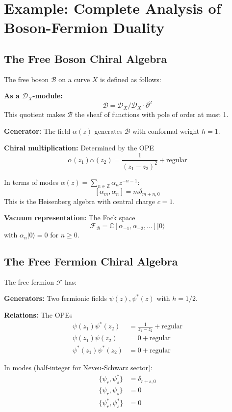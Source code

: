 \section{Example: Complete Analysis of Boson-Fermion Duality}

\subsection{The Free Boson Chiral Algebra}

The free boson $\mathcal{B}$ on a curve $X$ is defined as follows:

\textbf{As a $\mathcal{D}_X$-module:}
\[
\mathcal{B} = \mathcal{D}_X / \mathcal{D}_X \cdot \partial^2
\]
This quotient makes $\mathcal{B}$ the sheaf of functions with pole of order at most 1.

\textbf{Generator:} The field $\alpha(z)$ generates $\mathcal{B}$ with conformal weight $h = 1$.

\textbf{Chiral multiplication:} Determined by the OPE
\[
\alpha(z_1) \alpha(z_2) = \frac{1}{(z_1-z_2)^2} + \text{regular}
\]

In terms of modes $\alpha(z) = \sum_{n \in \mathbb{Z}} \alpha_n z^{-n-1}$:
\[
[\alpha_m, \alpha_n] = m \delta_{m+n,0}
\]
This is the Heisenberg algebra with central charge $c = 1$.

\textbf{Vacuum representation:} The Fock space
\[
\mathcal{F}_{\mathcal{B}} = \mathbb{C}[\alpha_{-1}, \alpha_{-2}, \ldots] |0\rangle
\]
with $\alpha_n |0\rangle = 0$ for $n \geq 0$.

\subsection{The Free Fermion Chiral Algebra}

The free fermion $\mathcal{F}$ has:

\textbf{Generators:} Two fermionic fields $\psi(z), \psi^*(z)$ with $h = 1/2$.

\textbf{Relations:} The OPEs
\begin{align}
\psi(z_1)\psi^*(z_2) &= \frac{1}{z_1-z_2} + \text{regular} \\
\psi(z_1)\psi(z_2) &= 0 + \text{regular} \\
\psi^*(z_1)\psi^*(z_2) &= 0 + \text{regular}
\end{align}

In modes (half-integer for Neveu-Schwarz sector):
\begin{align}
\{\psi_r, \psi^*_s\} &= \delta_{r+s,0} \\
\{\psi_r, \psi_s\} &= 0 \\
\{\psi^*_r, \psi^*_s\} &= 0
\end{align}

